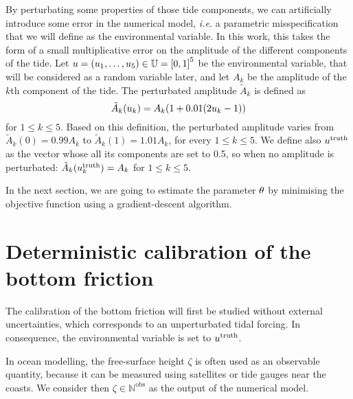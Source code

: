 \documentclass[../../Main_ManuscritThese.tex]{subfiles}
\begin{document}
By perturbating some properties of those tide components, we can
artificially introduce some error in the numerical model, \emph{i.e.}
a parametric misspecification that we will define as the environmental
variable. In this work, this takes the form of a small multiplicative
error on the amplitude of the different components of the tide. Let
$\uu = (\uu_1,\dots,\uu_5)\in \Uspace = \interval{0}{1}^5$ be the
environmental variable, that will be considered as a random variable
later, and let $A_k$ be the amplitude of the $k$th component of the
tide.  The perturbated amplitude $\tilde{A}_k$ is defined as
\begin{equation}
  \label{eq:tide_error}
  \tilde{A}_k(u_k) = A_k (1 + 0.01(2u_k - 1))
\end{equation}
for $1\leq k\leq 5$.
Based on this definition, the perturbated amplitude varies from
$\tilde{A}_k(0) = 0.99A_k$ to $\tilde{A}_k(1) = 1.01A_k$, for every
$1\leq k \leq 5$. We define also $u^{\mathrm{truth}}$ as
the vector whose all its components are set to \num{0.5}, so when no
amplitude is perturbated: $\tilde{A}_k(u_k^{\mathrm{truth}}) = A_k$
for $1\leq k \leq 5$.


In the next section, we are going to estimate the parameter $\theta$ by
minimising the objective function using a gradient-descent algorithm.
\section{Deterministic calibration of the bottom friction}
\label{sec:deterministic_calibration_bott}
The calibration of the bottom friction will first be studied without
external uncertainties, which corresponds to an unperturbated tidal
forcing. In consequence, the environmental variable is set to
$u^{\mathrm{truth}}$.

In ocean modelling, the free-surface height $\zeta$ is often used as
an observable quantity, because it can be measured using satellites or
tide gauges near the coasts. We consider then
$\zeta\in \mathbb{N}^{\mathrm{obs}}$ as the output of the numerical
model.
\end{document}
